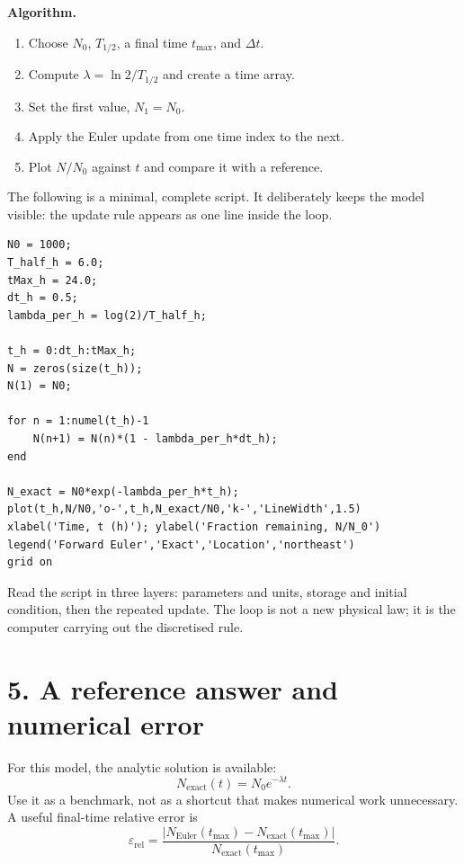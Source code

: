 \documentclass[11pt,a4paper]{article}
\begin{document}
\textbf{Algorithm.}
\begin{enumerate}[nosep,leftmargin=6mm]
  \item Choose $N_0$, $T_{1/2}$, a final time $t_{\max}$, and $\Delta t$.
  \item Compute $\lambda=\ln2/T_{1/2}$ and create a time array.
  \item Set the first value, $N_1=N_0$.
  \item Apply the Euler update from one time index to the next.
  \item Plot $N/N_0$ against $t$ and compare it with a reference.
\end{enumerate}

The following is a minimal, complete script. It deliberately keeps the model visible: the update rule appears as one line inside the loop.
\begin{lstlisting}[style=matlabstyle,caption={A first Euler simulation}]
N0 = 1000;
T_half_h = 6.0;
tMax_h = 24.0;
dt_h = 0.5;
lambda_per_h = log(2)/T_half_h;

t_h = 0:dt_h:tMax_h;
N = zeros(size(t_h));
N(1) = N0;

for n = 1:numel(t_h)-1
    N(n+1) = N(n)*(1 - lambda_per_h*dt_h);
end

N_exact = N0*exp(-lambda_per_h*t_h);
plot(t_h,N/N0,'o-',t_h,N_exact/N0,'k-','LineWidth',1.5)
xlabel('Time, t (h)'); ylabel('Fraction remaining, N/N_0')
legend('Forward Euler','Exact','Location','northeast')
grid on
\end{lstlisting}

Read the script in three layers: parameters and units, storage and initial condition, then the repeated update. The loop is not a new physical law; it is the computer carrying out the discretised rule.

\section*{5. A reference answer and numerical error}
For this model, the analytic solution is available:
\begin{equation}
  N_{\mathrm{exact}}(t)=N_0e^{-\lambda t}.
\end{equation}
Use it as a benchmark, not as a shortcut that makes numerical work unnecessary. A useful final-time relative error is
\begin{equation}
  \varepsilon_{\mathrm{rel}}=\frac{\left|N_{\mathrm{Euler}}(t_{\max})-N_{\mathrm{exact}}(t_{\max})\right|}{N_{\mathrm{exact}}(t_{\max})}.
\end{equation}
\end{document}
